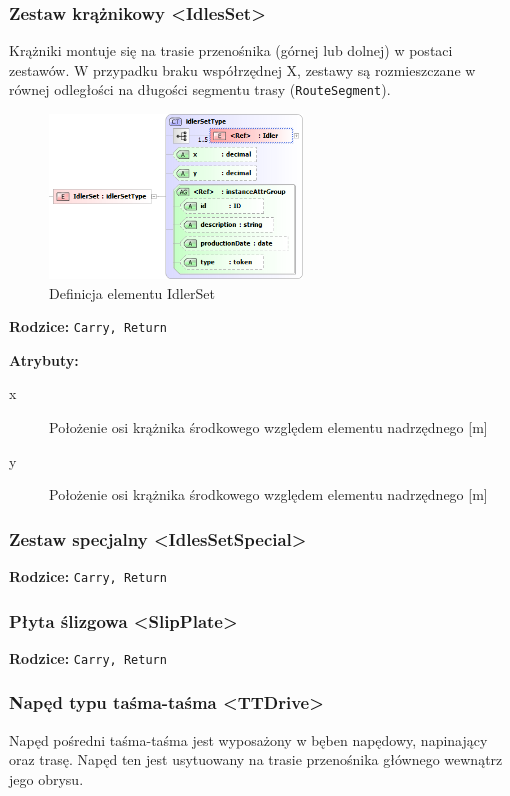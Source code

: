 \documentclass[12pt,a4paper]{article}
\begin{document}
\subsubsection{Zestaw krążnikowy <IdlesSet>}
Krążniki montuje się na trasie przenośnika (górnej lub dolnej) w postaci
zestawów.  W przypadku braku współrzędnej X, zestawy są rozmieszczane w równej
odległości na długości segmentu trasy ({\tt RouteSegment}).

\begin{figure}[H]
  \centering
  \includegraphics[width=0.6\textwidth]{png/liquid/IdlerSet}
  \caption{Definicja elementu IdlerSet}
  \label{fig:idlerSet-xsd}
\end{figure}

\noindent\textbf{Rodzice:} \texttt{Carry, Return}

\noindent\textbf{Atrybuty:}
\begin{description}
\item[x] Położenie osi krążnika środkowego względem elementu nadrzędnego [m]
\item[y] Położenie osi krążnika środkowego względem elementu nadrzędnego [m]
\end{description}


\subsubsection{Zestaw specjalny <IdlesSetSpecial>}
\noindent\textbf{Rodzice:} \texttt{Carry, Return}

\subsubsection{Płyta ślizgowa <SlipPlate>}
\noindent\textbf{Rodzice:} \texttt{Carry, Return}

\subsubsection{Napęd typu taśma-taśma <TTDrive>}
Napęd pośredni taśma-taśma jest wyposażony w bęben napędowy, napinający oraz
trasę.  Napęd ten jest usytuowany na trasie przenośnika głównego wewnątrz jego
obrysu.
\end{document}
